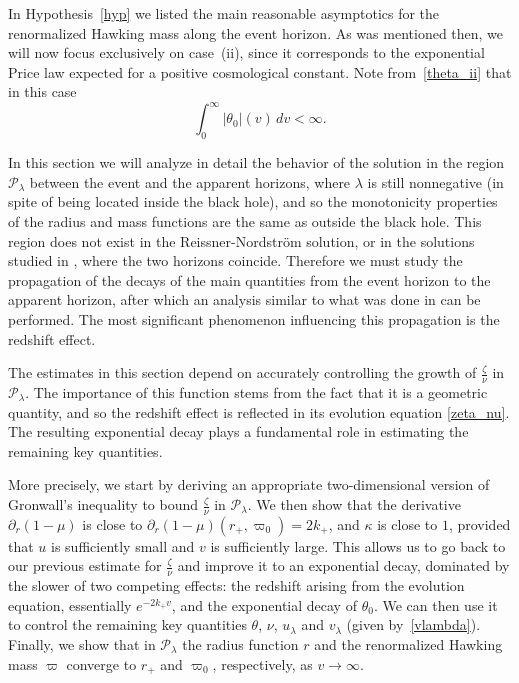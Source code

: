 \documentclass[a4paper,11pt,oneside,reqno]{amsart}
\newcommand{\cal}{\mathcal}
\begin{document}
In Hypothesis~\ref{hyp} we listed the main reasonable asymptotics for the renormalized Hawking mass along the event horizon. As was mentioned then, we will now focus exclusively on case~(ii), since it corresponds to the exponential Price law expected for a positive cosmological constant. Note from~\eqref{theta_ii} that in this case
\[
\int_0^\infty |\theta_0|(v)\,dv < \infty.
\]

In this section we will analyze in detail the behavior of the solution in the region ${\cal P}_\lambda$ between the event and the apparent horizons, where $\lambda$ is still nonnegative (in spite of being located inside the black hole), and so the monotonicity properties of the radius and mass functions are the same as outside the black hole. This region does not exist in the Reissner-Nordstr\"om solution, or in the solutions studied in \cite{relIst2,relIst3}, where the two horizons coincide. Therefore we must study the propagation of the decays of the main quantities from the event horizon to the apparent horizon, after which an analysis similar to what was done in \cite{relIst2,relIst3} can be performed. The most significant phenomenon influencing this propagation is the redshift effect.

The estimates in this section depend on accurately controlling the growth of $\frac{\zeta}{\nu}$ in ${\cal P}_\lambda$. The importance of this function stems from the fact that it is a geometric quantity, and so the redshift effect is reflected in its evolution equation \eqref{zeta_nu}. The resulting exponential decay plays a fundamental role in estimating the remaining key quantities.


More precisely, we start by deriving an appropriate two-dimensional version of Gronwall's inequality 
to bound $\frac{\zeta}{\nu}$ in ${\cal P}_\lambda$. We then 
show that the derivative $\partial_r(1-\mu)$ is close to
$\partial_r(1-\mu)(r_+,\varpi_0)= 2k_+$, and $\kappa$ is close to $1$, provided that $u$ is
sufficiently small and $v$ is sufficiently large. This allows us to go back to our
previous estimate for $\frac{\zeta}{\nu}$ and improve it to an exponential decay, dominated by the slower of two competing effects: the redshift arising from the evolution equation, essentially $e^{-2k_+ v}$, and the exponential decay of $\theta_0$.
We can then use it to control the remaining key quantities $\theta$, $\nu$, $u_\lambda$ and $v_\lambda$ (given by~\eqref{vlambda}).
Finally, we show that in ${\cal P}_\lambda$ the radius function $r$ and the renormalized Hawking mass $\varpi$ converge to $r_+$ and
$\varpi_0$, respectively, as $v\to\infty$.
\end{document}

